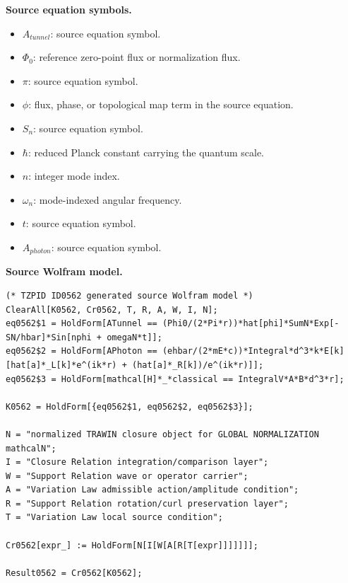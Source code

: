 \begin{minipage}[t]{0.49\linewidth}
\begingroup
\small
\raggedright
\textbf{Source equation symbols.}\par
\begin{itemize}[leftmargin=1.35em,itemsep=1pt,topsep=1pt,parsep=0pt]
    \item $A_{tunnel}$: source equation symbol.
    \item $\Phi_0$: reference zero-point flux or normalization flux.
    \item $\pi$: source equation symbol.
    \item $\phi$: flux, phase, or topological map term in the source equation.
    \item $S_n$: source equation symbol.
    \item $\hbar$: reduced Planck constant carrying the quantum scale.
    \item $n$: integer mode index.
    \item $\omega_n$: mode-indexed angular frequency.
    \item $t$: source equation symbol.
    \item $A_{photon}$: source equation symbol.
\end{itemize}
\endgroup
\end{minipage}\hfill
\begin{minipage}[t]{0.47\linewidth}
\begingroup
\scriptsize
\raggedright
\textbf{Source Wolfram model.}\par
\begin{Verbatim}[fontsize=\tiny,breaklines=true,breakanywhere=true]
(* TZPID ID0562 generated source Wolfram model *)
ClearAll[K0562, Cr0562, T, R, A, W, I, N];
eq0562$1 = HoldForm[ATunnel == (Phi0/(2*Pi*r))*hat[phi]*SumN*Exp[-SN/hbar]*Sin[nphi + omegaN*t]];
eq0562$2 = HoldForm[APhoton == (ehbar/(2*mE*c))*Integral*d^3*k*E[k][hat[a]*_L[k]*e^(ik*r) + (hat[a]*_R[k])/e^(ik*r)]];
eq0562$3 = HoldForm[mathcal[H]*_*classical == IntegralV*A*B*d^3*r];

K0562 = HoldForm[{eq0562$1, eq0562$2, eq0562$3}];

N = "normalized TRAWIN closure object for GLOBAL NORMALIZATION mathcalN";
I = "Closure Relation integration/comparison layer";
W = "Support Relation wave or operator carrier";
A = "Variation Law admissible action/amplitude condition";
R = "Support Relation rotation/curl preservation layer";
T = "Variation Law local source condition";

Cr0562[expr_] := HoldForm[N[I[W[A[R[T[expr]]]]]]];

Result0562 = Cr0562[K0562];
\end{Verbatim}
\endgroup
\end{minipage}

